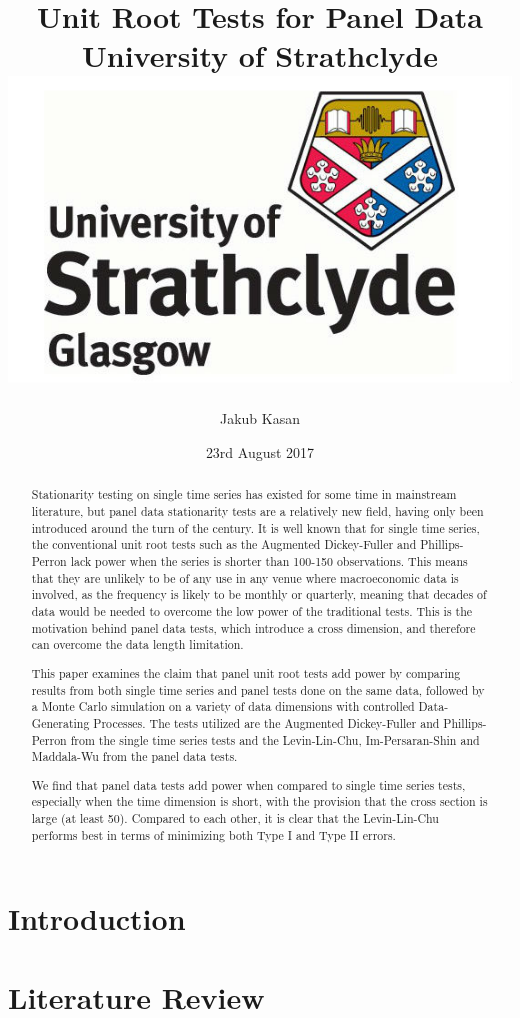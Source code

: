 \documentclass[12pt]{report}
\title{
	{Unit Root Tests for Panel Data}\\
	{\large University of Strathclyde \linebreak}\\
	{\includegraphics[scale=0.25]{university.jpg}}
}
\author{Jakub Kasan}
\date{23rd August 2017}
\begin{document}
	\maketitle
		\renewcommand{\bibname}{}
	\begin{abstract}
		Stationarity testing on single time series has existed for some time in mainstream literature, but panel data stationarity tests are a relatively new field, having only been introduced around the turn of the century. It is well known that for single time series, the conventional unit root tests such as the Augmented Dickey-Fuller and Phillips-Perron lack power when the series is shorter than 100-150 observations. This means that they are unlikely to be of any use in any venue where macroeconomic data is involved, as the frequency is likely to be monthly or quarterly, meaning that decades of data would be needed to overcome the low power of the traditional tests. This is the motivation behind panel data tests, which introduce a cross dimension, and therefore can overcome the data length limitation.
		
		This paper examines the claim that panel unit root tests add power by comparing results from both single time series and panel tests done on the same data, followed by a Monte Carlo simulation on a variety of data dimensions with controlled Data-Generating Processes. The tests utilized are the Augmented Dickey-Fuller and Phillips-Perron from the single time series tests and the Levin-Lin-Chu, Im-Persaran-Shin and Maddala-Wu from the panel data tests.
		
		We find that panel data tests add power when compared to single time series tests, especially when the time dimension is short, with the provision that the cross section is large (at least 50). Compared to each other, it is clear that the Levin-Lin-Chu performs best in terms of minimizing both Type I and Type II errors.
		
	\end{abstract}

	\tableofcontents


	\chapter{Introduction}
	
	
	\chapter{Literature Review}
	
	
\end{document}
